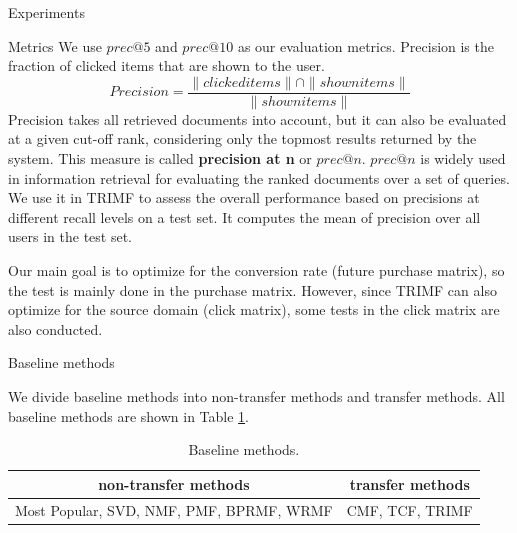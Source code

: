 \begin{section}{Experiments}
\begin{subsection}{Metrics}
We use $prec@5$ and $prec@10$ as our evaluation metrics. Precision is the fraction of clicked items that are shown to the user. $$Precision = \frac{\|clicked items\| \cap \|shown items\|}{\|shown items\|}$$Precision takes all retrieved documents into account, but it can also be evaluated at a given cut-off rank, considering only the topmost results returned by the system. This measure is called \textbf{precision at n} or \textbf{$prec@n$}. $prec@n$ is widely used in information retrieval for evaluating the ranked documents over a set of queries. We use it in TRIMF to assess the overall performance based on precisions at different recall levels on a test set. It computes the mean of precision over all users in the test set. 

Our main goal is to optimize for the conversion rate (future purchase matrix), so the test is mainly done in the purchase matrix. However, since TRIMF can also optimize for the source domain (click matrix), some tests in the click matrix are also conducted.

  
\end{subsection}

\begin{subsection}{Baseline methods}  

We divide baseline methods into non-transfer methods and transfer methods. All baseline methods are shown in Table \ref{baseline}.
\begin{table}

\begin{center}
  \begin{tabular}{|c|c|}
    \hline
    non-transfer methods & transfer methods\\
    \hline
    Most Popular, SVD, NMF, PMF, BPRMF, WRMF&CMF, TCF, TRIMF\\
\hline
  \end{tabular}
\end{center}
\caption{Baseline methods.}
\label{baseline}


\end{table}

\end{subsection}
\end{section}
